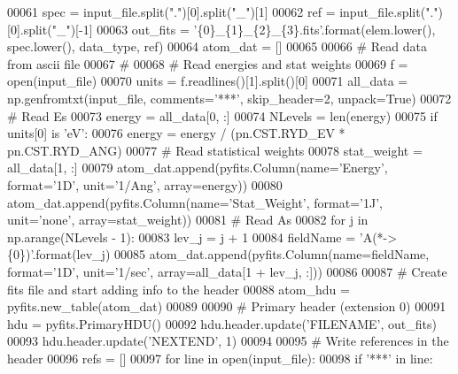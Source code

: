 \begin{DoxyCode}
00061     spec = input\_file.split(\textcolor{stringliteral}{"."})[0].split(\textcolor{stringliteral}{"\_"})[1]
00062     ref = input\_file.split(\textcolor{stringliteral}{"."})[0].split(\textcolor{stringliteral}{"\_"})[-1]
00063     out\_fits = \textcolor{stringliteral}{'\{0\}\_\{1\}\_\{2\}\_\{3\}.fits'}.format(elem.lower(), spec.lower(), data\_type, ref)
00064     atom\_dat = []
00065 
00066     \textcolor{comment}{# Read data from ascii file}
00067     \textcolor{comment}{#}
00068     \textcolor{comment}{# Read energies and stat weights }
00069     f = open(input\_file)
00070     units = f.readlines()[1].split()[0]
00071     all\_data = np.genfromtxt(input\_file, comments=\textcolor{stringliteral}{'***'}, skip\_header=2, unpack=\textcolor{keyword}{True})
00072     \textcolor{comment}{# Read Es}
00073     energy = all\_data[0, :]
00074     NLevels = len(energy)
00075     \textcolor{keywordflow}{if} units[0] \textcolor{keywordflow}{is} \textcolor{stringliteral}{'eV'}: 
00076         energy = energy / (pn.CST.RYD\_EV * pn.CST.RYD\_ANG)
00077     \textcolor{comment}{# Read statistical weights}
00078     stat\_weight = all\_data[1, :]
00079     atom\_dat.append(pyfits.Column(name=\textcolor{stringliteral}{'Energy'}, format=\textcolor{stringliteral}{'1D'}, unit=\textcolor{stringliteral}{'1/Ang'}, array=energy))
00080     atom\_dat.append(pyfits.Column(name=\textcolor{stringliteral}{'Stat\_Weight'}, format=\textcolor{stringliteral}{'1J'}, unit=\textcolor{stringliteral}{'none'}, array=stat\_weight))    
00081     \textcolor{comment}{# Read As}
00082     \textcolor{keywordflow}{for} j \textcolor{keywordflow}{in} np.arange(NLevels - 1):
00083         lev\_j = j + 1
00084         fieldName = \textcolor{stringliteral}{'A(*->\{0\})'}.format(lev\_j)
00085         atom\_dat.append(pyfits.Column(name=fieldName, format=\textcolor{stringliteral}{'1D'}, unit=\textcolor{stringliteral}{'1/sec'}, array=all\_data[1 + lev\_j, 
      :]))
00086 
00087     \textcolor{comment}{# Create fits file and start adding info to the header}
00088     atom\_hdu = pyfits.new\_table(atom\_dat)   
00089             
00090     \textcolor{comment}{# Primary header (extension 0)}
00091     hdu = pyfits.PrimaryHDU()
00092     hdu.header.update(\textcolor{stringliteral}{'FILENAME'}, out\_fits)
00093     hdu.header.update(\textcolor{stringliteral}{'NEXTEND'}, 1)
00094  
00095     \textcolor{comment}{# Write references in the header}
00096     refs = []
00097     \textcolor{keywordflow}{for} line \textcolor{keywordflow}{in} open(input\_file):
00098         \textcolor{keywordflow}{if} \textcolor{stringliteral}{'***'} \textcolor{keywordflow}{in} line:

\end{DoxyCode}
